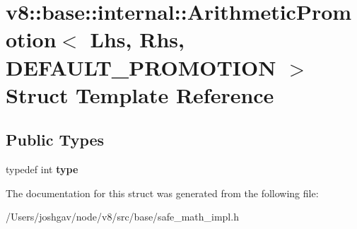 \hypertarget{structv8_1_1base_1_1internal_1_1_arithmetic_promotion_3_01_lhs_00_01_rhs_00_01_d_e_f_a_u_l_t___p_r_o_m_o_t_i_o_n_01_4}{}\section{v8\+:\+:base\+:\+:internal\+:\+:Arithmetic\+Promotion$<$ Lhs, Rhs, D\+E\+F\+A\+U\+L\+T\+\_\+\+P\+R\+O\+M\+O\+T\+I\+ON $>$ Struct Template Reference}
\label{structv8_1_1base_1_1internal_1_1_arithmetic_promotion_3_01_lhs_00_01_rhs_00_01_d_e_f_a_u_l_t___p_r_o_m_o_t_i_o_n_01_4}
\subsection*{Public Types}
\begin{DoxyCompactItemize}
\item 
typedef int {\bfseries type}\hypertarget{structv8_1_1base_1_1internal_1_1_arithmetic_promotion_3_01_lhs_00_01_rhs_00_01_d_e_f_a_u_l_t___p_r_o_m_o_t_i_o_n_01_4_a3700971f01b0a6dc93a795502bb45cdd}{}\label{structv8_1_1base_1_1internal_1_1_arithmetic_promotion_3_01_lhs_00_01_rhs_00_01_d_e_f_a_u_l_t___p_r_o_m_o_t_i_o_n_01_4_a3700971f01b0a6dc93a795502bb45cdd}

\end{DoxyCompactItemize}


The documentation for this struct was generated from the following file\+:\begin{DoxyCompactItemize}
\item 
/\+Users/joshgav/node/v8/src/base/safe\+\_\+math\+\_\+impl.\+h\end{DoxyCompactItemize}
